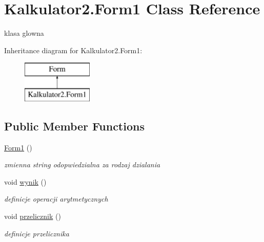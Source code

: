 \hypertarget{class_kalkulator2_1_1_form1}{\section{Kalkulator2.\+Form1 Class Reference}
\label{class_kalkulator2_1_1_form1}
}


klasa glowna  


Inheritance diagram for Kalkulator2.\+Form1\+:\begin{figure}[H]
\begin{center}
\leavevmode
\includegraphics[height=2.000000cm]{class_kalkulator2_1_1_form1}
\end{center}
\end{figure}
\subsection*{Public Member Functions}
\begin{DoxyCompactItemize}
\item 
\hypertarget{class_kalkulator2_1_1_form1_a4842665ea49e120742e351a3d7344bad}{\hyperlink{class_kalkulator2_1_1_form1_a4842665ea49e120742e351a3d7344bad}{Form1} ()}\label{class_kalkulator2_1_1_form1_a4842665ea49e120742e351a3d7344bad}

\begin{DoxyCompactList}\small\item\em zmienna string odopwiedzialna za rodzaj dzialania \end{DoxyCompactList}\item 
void \hyperlink{class_kalkulator2_1_1_form1_ab8f35af265ebacd5da7985e7006fa40b}{wynik} ()
\begin{DoxyCompactList}\small\item\em definicje operacji arytmetycznych \end{DoxyCompactList}\item 
void \hyperlink{class_kalkulator2_1_1_form1_aaf6649994f5b253a36bc5572cfba808f}{przelicznik} ()
\begin{DoxyCompactList}\small\item\em definicje przelicznika \end{DoxyCompactList}\end{DoxyCompactItemize}
